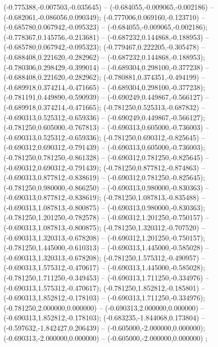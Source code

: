  (-0.775388,-0.007503,-0.035645) -- (-0.684055,-0.009065,-0.002186) -- (-0.682061,-0.086056,0.090349);
 (-0.777006,0.069160,-0.123710) -- (-0.685780,0.067942,-0.095323) -- (-0.684055,-0.009065,-0.002186);
 (-0.778367,0.145756,-0.213681) -- (-0.687232,0.144868,-0.188953) -- (-0.685780,0.067942,-0.095323);
 (-0.779467,0.222205,-0.305478) -- (-0.688408,0.221620,-0.282962) -- (-0.687232,0.144868,-0.188953);
 (-0.780306,0.298429,-0.399014) -- (-0.689304,0.298100,-0.377238) -- (-0.688408,0.221620,-0.282962);
 (-0.780881,0.374351,-0.494199) -- (-0.689918,0.374214,-0.471665) -- (-0.689304,0.298100,-0.377238);
 (-0.781191,0.449890,-0.590939) -- (-0.690249,0.449867,-0.566127) -- (-0.689918,0.374214,-0.471665);
 (-0.781250,0.525313,-0.687832) -- (-0.690313,0.525312,-0.659336) -- (-0.690249,0.449867,-0.566127);
 (-0.781250,0.605000,-0.767813) -- (-0.690313,0.605000,-0.736003) -- (-0.690313,0.525312,-0.659336);
 (-0.781250,0.690312,-0.825645) -- (-0.690312,0.690312,-0.791439) -- (-0.690313,0.605000,-0.736003);
 (-0.781250,0.781250,-0.861328) -- (-0.690312,0.781250,-0.825645) -- (-0.690312,0.690312,-0.791439);
 (-0.781250,0.877812,-0.874863) -- (-0.690313,0.877812,-0.838619) -- (-0.690312,0.781250,-0.825645);
 (-0.781250,0.980000,-0.866250) -- (-0.690313,0.980000,-0.830363) -- (-0.690313,0.877812,-0.838619);
 (-0.781250,1.087813,-0.835488) -- (-0.690313,1.087813,-0.800875) -- (-0.690313,0.980000,-0.830363);
 (-0.781250,1.201250,-0.782578) -- (-0.690312,1.201250,-0.750157) -- (-0.690313,1.087813,-0.800875);
 (-0.781250,1.320312,-0.707520) -- (-0.690313,1.320313,-0.678208) -- (-0.690312,1.201250,-0.750157);
 (-0.781250,1.445000,-0.610313) -- (-0.690313,1.445000,-0.585028) -- (-0.690313,1.320313,-0.678208);
 (-0.781250,1.575312,-0.490957) -- (-0.690313,1.575312,-0.470617) -- (-0.690313,1.445000,-0.585028);
 (-0.781250,1.711250,-0.349453) -- (-0.690313,1.711250,-0.334976) -- (-0.690313,1.575312,-0.470617);
 (-0.781250,1.852812,-0.185801) -- (-0.690313,1.852812,-0.178103) -- (-0.690313,1.711250,-0.334976);
 (-0.781250,2.000000,0.000000) -- (-0.690313,2.000000,0.000000) -- (-0.690313,1.852812,-0.178103);
 (-0.683235,-1.844068,0.173804) -- (-0.597632,-1.842427,0.206439) -- (-0.605000,-2.000000,0.000000);
 (-0.690313,-2.000000,0.000000) -- (-0.605000,-2.000000,0.000000) ;
